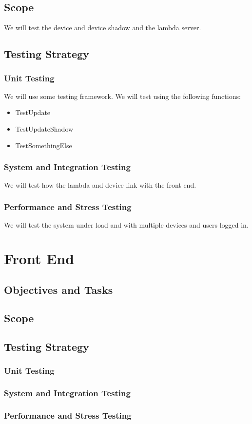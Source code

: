\documentclass{article}
\begin{document}
	\subsection{Scope}
		We will test the device and device shadow and the lambda server.
	
	\subsection{Testing Strategy}
		\subsubsection{Unit Testing}
			We will use some testing framework. We will test using the following functions:
			\begin{itemize}
				\item TestUpdate
				\item TestUpdateShadow
				\item TestSomethingElse
			\end{itemize}
		\subsubsection{System and Integration Testing}
			We will test how the lambda and device link with the front end.
		\subsubsection{Performance and Stress Testing}
			We will test the system under load and with multiple devices and users logged in.
		
\section{Front End}
	\subsection{Objectives and Tasks}
		
	\subsection{Scope}
		
	\subsection{Testing Strategy}
		\subsubsection{Unit Testing}
		\subsubsection{System and Integration Testing}
		\subsubsection{Performance and Stress Testing}
\end{document}
